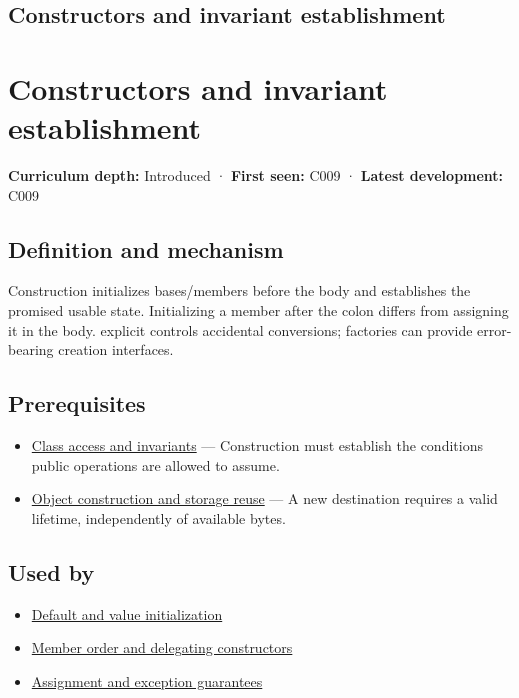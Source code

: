 \hypertarget{appendix-7f8ec83d0886}{}
\section*{Constructors and invariant establishment}
\chapter{Constructors and invariant establishment}\label{appendix-7f8ec83d0886-constructors-and-invariant-establishment}

\textbf{Curriculum depth:} Introduced · \textbf{First seen:} C009 · \textbf{Latest development:} C009

\section{Definition and mechanism}\label{appendix-7f8ec83d0886-definition-and-mechanism}

Construction initializes bases/members before the body and establishes the promised usable state. Initializing a member after the colon differs from assigning it in the body. explicit controls accidental conversions; factories can provide error-bearing creation interfaces.

\section{Prerequisites}\label{appendix-7f8ec83d0886-prerequisites}

\begin{itemize}
\tightlist
\item
  \hyperref[appendix-8e5214819615]{Class access and invariants} --- Construction must establish the conditions public operations are allowed to assume.
\item
  \hyperref[appendix-a82f9c438857]{Object construction and storage reuse} --- A new destination requires a valid lifetime, independently of available bytes.
\end{itemize}

\section{Used by}\label{appendix-7f8ec83d0886-used-by}

\begin{itemize}
\tightlist
\item
  \hyperref[appendix-ba8c1a9fe03f]{Default and value initialization}
\item
  \hyperref[appendix-3cb49709605a]{Member order and delegating constructors}
\item
  \hyperref[appendix-bea6beb5350f]{Assignment and exception guarantees}
\end{itemize}

